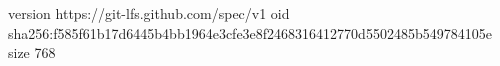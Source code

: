 version https://git-lfs.github.com/spec/v1
oid sha256:f585f61b17d6445b4bb1964e3cfe3e8f2468316412770d5502485b549784105e
size 768
